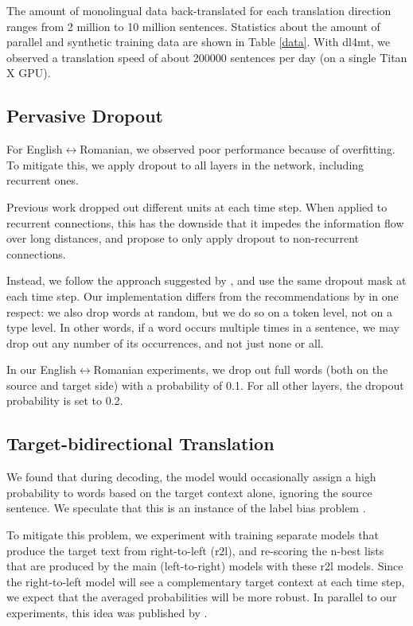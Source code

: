 \documentclass[11pt]{article}
\begin{document}
The amount of monolingual data back-translated for each translation direction ranges from 2 million to 10 million sentences.
Statistics about the amount of parallel and synthetic training data are shown in Table \ref{data}.
With dl4mt, we observed a translation speed of about \num{200000} sentences per day (on a single Titan X GPU).

\subsection{Pervasive Dropout}

For English$\leftrightarrow$Romanian, we observed poor performance because of overfitting.
To mitigate this, we apply dropout to all layers in the network, including recurrent ones. 

Previous work dropped out different units at each time step.
When applied to recurrent connections, this has the downside that it impedes the information flow over long distances,
and  propose to only apply dropout to non-recurrent connections.

Instead, we follow the approach suggested by , and use the same dropout mask at each time step.
Our implementation differs from the recommendations by  in one respect: we also drop words at random, but we do so on a token level, not on a type level.
In other words, if a word occurs multiple times in a sentence, we may drop out any number of its occurrences, and not just none or all.

In our English$\leftrightarrow$Romanian experiments, we drop out full words (both on the source and target side) with a probability of 0.1.
For all other layers, the dropout probability is set to 0.2.

\subsection{Target-bidirectional Translation}

We found that during decoding, the model would occasionally assign a high probability to words based on the target context alone, ignoring the source sentence.
We speculate that this is an instance of the label bias problem \cite{lafferty2001conditional}.

To mitigate this problem, we experiment with training separate models that produce the target text from right-to-left (r2l),
and re-scoring the n-best lists that are produced by the main (left-to-right) models with these r2l models.
Since the right-to-left model will see a complementary target context at each time step, we expect that the averaged probabilities will be more robust.
In parallel to our experiments, this idea was published by .
\end{document}
